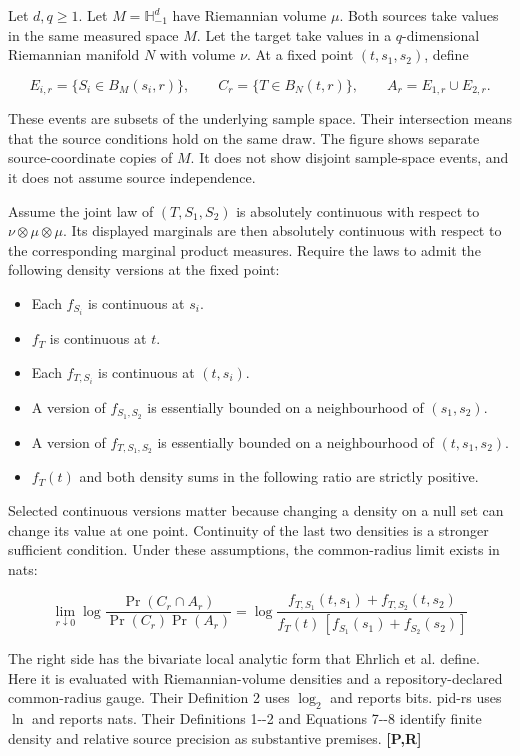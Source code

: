 \documentclass[
  11pt,
  a4paper,
]{article}
\providecommand{\tightlist}{%
  \setlength{\itemsep}{0pt}\setlength{\parskip}{0pt}}
\begin{document}
Let \(d,q\geq1\). Let \(M=\mathbb H^d_{-1}\) have Riemannian volume
\(\mu\). Both sources take values in the same measured space \(M\). Let
the target take values in a \(q\)-dimensional Riemannian manifold \(N\)
with volume \(\nu\). At a fixed point \((t,s_1,s_2)\), define

\[
E_{i,r}=\{S_i\in B_M(s_i,r)\},\qquad
C_r=\{T\in B_N(t,r)\},\qquad
A_r=E_{1,r}\cup E_{2,r}.
\]

These events are subsets of the underlying sample space. Their
intersection means that the source conditions hold on the same draw. The
figure shows separate source-coordinate copies of \(M\). It does not
show disjoint sample-space events, and it does not assume source
independence.

Assume the joint law of \((T,S_1,S_2)\) is absolutely continuous with
respect to \(\nu\otimes\mu\otimes\mu\). Its displayed marginals are then
absolutely continuous with respect to the corresponding marginal product
measures. Require the laws to admit the following density versions at
the fixed point:

\begin{itemize}
\tightlist
\item
  Each \(f_{S_i}\) is continuous at \(s_i\).
\item
  \(f_T\) is continuous at \(t\).
\item
  Each \(f_{T,S_i}\) is continuous at \((t,s_i)\).
\item
  A version of \(f_{S_1,S_2}\) is essentially bounded on a neighbourhood
  of \((s_1,s_2)\).
\item
  A version of \(f_{T,S_1,S_2}\) is essentially bounded on a
  neighbourhood of \((t,s_1,s_2)\).
\item
  \(f_T(t)\) and both density sums in the following ratio are strictly
  positive.
\end{itemize}

Selected continuous versions matter because changing a density on a null
set can change its value at one point. Continuity of the last two
densities is a stronger sufficient condition. Under these assumptions,
the common-radius limit exists in nats:

\[
\boxed{
\lim_{r\downarrow0}\log
\frac{\Pr(C_r\cap A_r)}{\Pr(C_r)\Pr(A_r)}
=\log
\frac{f_{T,S_1}(t,s_1)+f_{T,S_2}(t,s_2)}
{f_T(t)\,[f_{S_1}(s_1)+f_{S_2}(s_2)]}}
\]

The right side has the bivariate local analytic form that Ehrlich et al.
define. Here it is evaluated with Riemannian-volume densities and a
repository-declared common-radius gauge. Their Definition 2 uses
\(\log_2\) and reports bits. pid-rs uses \(\ln\) and reports nats. Their
Definitions 1-\/-2 and Equations 7-\/-8 identify finite density and
relative source precision as substantive premises. \textbf{{[}P,R{]}}
\end{document}
